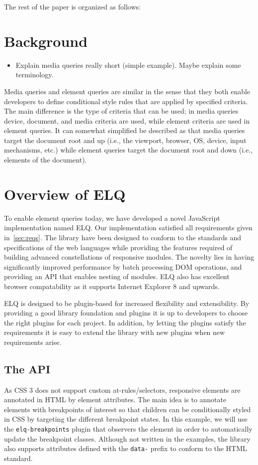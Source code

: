 \documentclass{acm_proc_article-sp}
\newcommand{\code}[1]{\texttt{#1}}
\newcommand{\elq}{ELQ}
\begin{document}
    The rest of the paper is organized as follows:


\section{Background}
  \begin{itemize}
    \item Explain media queries really short (simple example). Maybe explain some terminology.
  \end{itemize}

  Media queries and element queries are similar in the sense that they both enable developers to define conditional style rules that are applied by specified criteria.
  The main difference is the type of criteria that can be used; in media queries device, document, and media criteria are used, while element criteria are used in element queries.
  It can somewhat simplified be described as that media queries target the document root and up (i.e., the viewport, browser, OS, device, input mechanisms, etc.) while element queries target the document root and down (i.e., elements of the document).


\section{Overview of \elq{}}
  To enable element queries today, we have developed a novel JavaScript implementation named \elq{}.
  Our implementation satisfied all requirements given in~\ref{sec:reqs}.
  The library have been designed to conform to the standards and specifications of the web languages while providing the features required of building advanced constellations of responsive modules.
  The novelty lies in having significantly improved performance by batch processing DOM operations, and providing an API that enables nesting of modules.
  \elq{} also has excellent browser compatability as it supports Internet Explorer 8 and upwards.

  \elq{} is designed to be plugin-based for increased flexibility and extensibility.
  By providing a good library foundation and plugins it is up to developers to choose the right plugins for each project.
  In addition, by letting the plugins satisfy the requirements it is easy to extend the library with new plugins when new requirements arise.

  \subsection{The API}
    As CSS 3 does not support custom at-rules/selectors, responsive elements are annotated in HTML by element attributes.
    The main idea is to annotate elements with breakpoints of interest so that children can be conditionally styled in CSS by targeting the different breakpoint states.
    In this example, we will use the \code{elq-breakpoints} plugin that observers the element in order to automatically update the breakpoint classes.
    Although not written in the examples, the library also supports attributes defined with the \code{data-} prefix to conform to the HTML standard.
\end{document}
